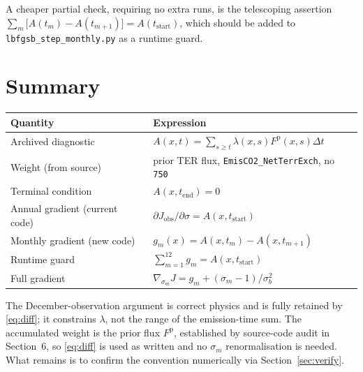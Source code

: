 \documentclass[12pt]{article}
\newcommand{\Fprior}{F^{\mathrm{p}}}
\newcommand{\tend}{t_{\mathrm{end}}}
\newcommand{\tstart}{t_{\mathrm{start}}}
\newcommand{\Adj}{A}
\begin{document}
A cheaper partial check, requiring no extra runs, is the telescoping assertion
$\sum_{m} \big[\Adj(t_m) - \Adj(t_{m+1})\big] = \Adj(\tstart)$, which should be added
to \texttt{lbfgsb\_step\_monthly.py} as a runtime guard.

\section{Summary}

\begin{center}
\begin{tabular}{@{}ll@{}}
\toprule
Quantity & Expression \\
\midrule
Archived diagnostic & $\Adj(x,t) = \sum_{s \ge t} \lambda(x,s)\Fprior(x,s)\Delta t$ \\
Weight (from source) & prior TER flux, \texttt{EmisCO2\_NetTerrExch}, no \texttt{750} \\
Terminal condition & $\Adj(x,\tend) = 0$ \\
Annual gradient (current code) & $\partial J_{\mathrm{obs}}/\partial\sigma = \Adj(x,\tstart)$ \\
Monthly gradient (new code) & $g_m(x) = \Adj(x,t_m) - \Adj(x,t_{m+1})$ \\
Runtime guard & $\sum_{m=1}^{12} g_m = \Adj(x,\tstart)$ \\
Full gradient & $\nabla_{\sigma_m} J = g_m + (\sigma_m - 1)/\sigma_b^2$ \\
\bottomrule
\end{tabular}
\end{center}

\noindent
The December-observation argument is correct physics and is fully retained by
\eqref{eq:diff}; it constrains $\lambda$, not the range of the emission-time sum.
The accumulated weight is the prior flux $\Fprior$, established by source-code audit in
Section~6, so \eqref{eq:diff} is used as written and no $\sigma_m$ renormalisation is
needed. What remains is to confirm the convention numerically via Section~\ref{sec:verify}.
\end{document}
